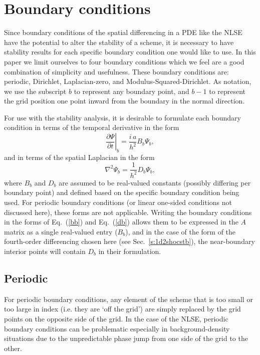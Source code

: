 \documentclass{article}
\begin{document}
\section{Boundary conditions}
\label{s:bc}
Since boundary conditions of the spatial differencing in a PDE like the NLSE have the potential to alter the stability of a scheme, it is necessary to have stability results for each specific boundary condition one would like to use.  In this paper we limit ourselves to four boundary conditions which we feel are a good combination of simplicity and usefulness.  These boundary conditions are: periodic, Dirichlet, Laplacian-zero, and Modulus-Squared-Dirichlet.  As notation, we use the subscript $b$ to represent any boundary point, and $b-1$ to represent the grid position one point inward from the boundary in the normal direction.

For use with the stability analysis, it is desirable to formulate each boundary condition in terms of the temporal derivative in the form
\begin{equation}
\label{bb}
\left. \frac{\partial \Psi}{\partial t}\right|_b = \frac{i\,a}{h^2} B_b \Psi_b,
\end{equation}
and in terms of the spatial Laplacian in the form
\begin{equation}
\label{db}
\nabla^2\Psi_b = \frac{1}{h^2} D_b \Psi_b,
\end{equation}
where $B_b$ and $D_b$ are assumed to be real-valued constants (possibly differing per boundary point) and defined based on the specific boundary condition being used.  For periodic boundary conditions (or linear one-sided conditions not discussed here), these forms are not applicable.  Writing the boundary conditions in the forms of Eq.~(\ref{bb}) and Eq.~(\ref{db}) allows them to be expressed in the $A$ matrix as a single real-valued entry ($B_b$), and in the case of the form of the fourth-order differencing chosen here (see Sec.~\ref{s:1d2shocstb}), the near-boundary interior points will contain $D_b$ in their formulation.

\subsection{Periodic}
For periodic boundary conditions, any element of the scheme that is too small or too large in index (i.e. they are `off the grid') are simply replaced by the grid points on the opposite side of the grid.  In the case of the NLSE, periodic boundary conditions can be problematic especially in background-density situations due to the unpredictable phase jump from one side of the grid to the other.
\end{document}
